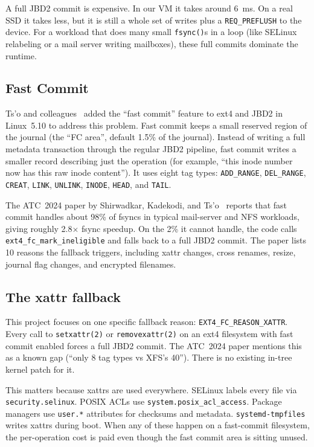 \documentclass[11pt,a4paper]{article}
\begin{document}
A full JBD2 commit is expensive. In our VM it takes around 6~ms. On
a real SSD it takes less, but it is still a whole set of writes
plus a \texttt{REQ\_PREFLUSH} to the device. For a workload that
does many small \texttt{fsync()}s in a loop (like SELinux relabeling
or a mail server writing mailboxes), these full commits dominate
the runtime.

\subsection{Fast Commit}

Ts'o and colleagues~\cite{atc24-fc} added the ``fast commit''
feature to ext4 and JBD2 in Linux~5.10 to address this problem.
Fast commit keeps a small reserved region of the journal (the
``FC area'', default 1.5\% of the journal). Instead of writing a
full metadata transaction through the regular JBD2 pipeline, fast
commit writes a smaller record describing just the operation (for
example, ``this inode number now has this raw inode content''). It
uses eight tag types: \texttt{ADD\_RANGE}, \texttt{DEL\_RANGE},
\texttt{CREAT}, \texttt{LINK}, \texttt{UNLINK}, \texttt{INODE},
\texttt{HEAD}, and \texttt{TAIL}.

The ATC~2024 paper by Shirwadkar, Kadekodi, and Ts'o~\cite{atc24-fc}
reports that fast commit handles about 98\% of fsyncs in typical
mail-server and NFS workloads, giving roughly 2.8$\times$ fsync
speedup. On the 2\% it cannot handle, the code calls
\texttt{ext4\_fc\_mark\_ineligible} and falls back to a full JBD2
commit. The paper lists 10 reasons the fallback triggers, including
xattr changes, cross renames, resize, journal flag changes, and
encrypted filenames.

\subsection{The xattr fallback}

This project focuses on one specific fallback reason:
\texttt{EXT4\_FC\_REASON\_XATTR}. Every call to
\texttt{setxattr(2)} or \texttt{removexattr(2)} on an ext4 filesystem
with fast commit enabled forces a full JBD2 commit. The ATC~2024
paper mentions this as a known gap (``only 8 tag types vs XFS's
40''). There is no existing in-tree kernel patch for it.

This matters because xattrs are used everywhere. SELinux labels
every file via \texttt{security.selinux}. POSIX ACLs use
\texttt{system.posix\_acl\_access}. Package managers use
\texttt{user.*} attributes for checksums and metadata.
\texttt{systemd-tmpfiles} writes xattrs during boot. When any of
these happen on a fast-commit filesystem, the per-operation cost is
paid even though the fast commit area is sitting unused.
\end{document}
